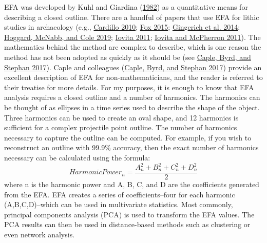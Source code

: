 \documentclass{article}
\begin{document}
EFA was developed by Kuhl and Giardina
(\protect\hyperlink{ref-Kuhl1982-kd}{1982}) as a quantitative means for
describing a closed outline. There are a handful of papers that use EFA
for lithic studies in archaeology (e.g.,
\protect\hyperlink{ref-Cardillo2010-ys}{Cardillo 2010};
\protect\hyperlink{ref-Fox2015-ox}{Fox 2015};
\protect\hyperlink{ref-Gingerich2014-cb}{Gingerich et al. 2014};
\protect\hyperlink{ref-Hoggard2019-yw}{Hoggard, McNabb, and Cole 2019};
\protect\hyperlink{ref-Iovita2011-nz}{Iovita 2011};
\protect\hyperlink{ref-Iovita2011-zp}{Iovita and McPherron 2011}). The
mathematics behind the method are complex to describe, which is one
reason the method has not been adopted as quickly as it should be (see
\protect\hyperlink{ref-Caple2017-mk}{Caple, Byrd, and Stephan 2017}).
Caple and colleagues (\protect\hyperlink{ref-Caple2017-mk}{Caple, Byrd,
and Stephan 2017}) provide an excellent description of EFA for
non-mathematicians, and the reader is referred to their treatise for
more details. For my purposes, it is enough to know that EFA analysis
requires a closed outline and a number of harmonics. The harmonics can
be thought of as ellipses in a time series used to describe the shape of
the object. Three harmonics can be used to create an oval shape, and 12
harmonics is sufficient for a complex projectile point outline. The
number of harmonics necessary to capture the outline can be computed.
For example, if you wish to reconstruct an outline with 99.9\% accuracy,
then the exact number of harmonics necessary can be calculated using the
formula: \[ HarmonicPower_n = \frac{A^2_n+B^2_n+C^2_n+D^2_n}{2} \] where
n is the harmonic power and A, B, C, and D are the coefficients
generated from the EFA. EFA creates a series of coefficients--four for
each harmonic (A,B,C,D)--which can be used in multivariate statistics.
Most commonly, principal components analysis (PCA) is used to transform
the EFA values. The PCA results can then be used in distance-based
methods such as clustering or even network analysis.
\end{document}
